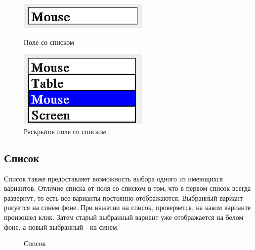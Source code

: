 \documentclass[14pt]{extarticle}
\begin{document}
		\begin{figure}[h]
		\begin{center}
		\begin{minipage}[h]{0.4\linewidth}
		\includegraphics[width=180pt]{pictures/comboBox1.png}
		\caption{ Поле со списком} %
		\label{ris:b1} %
		\end{minipage}
		\hfill 
		\begin{minipage}[h]{0.4\linewidth}
		\includegraphics[width=180pt]{pictures/comboBox2.png}
		\caption{Раскрытое поле со списком}
		\label{ris:b2}
		\end{minipage}
		\end{center}
		\end{figure}
		
	\subsection{Список}
	Список также предоставляет возможность выбора одного из имеющихся вариантов. Отличие списка от поля со списком в том, что в первом список всегда развернут, то есть все варианты постоянно отображаются. Выбранный вариант рисуется на синем фоне. При нажатии на список, проверяется, на каком варианте произошел клик. Затем старый выбранный вариант уже отображается на белом фоне, а новый выбранный - на синем. 
		\begin{figure}[h]
		\caption{Список}
		\label{ris:image}
		\end{figure}	
	
\end{document}
